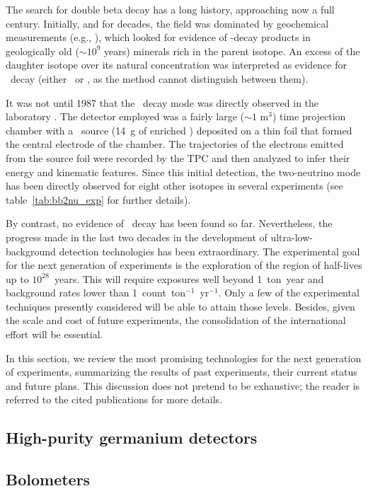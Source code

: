 The search for double beta decay has a long history, approaching now a full century. Initially, and for decades, the field was dominated by geochemical measurements (e.g., \cite{Inghram:1950qv}), which looked for evidence of \bb-decay products in geologically old ($\sim 10^9$ years) minerals rich in the parent isotope. An excess of the daughter isotope over its natural concentration was interpreted as evidence for \bb\ decay (either \bbtnu\ or \bbonu, as the method cannot distinguish between them). 

It was not until 1987 that the \bbtnu\ decay mode was directly observed in the laboratory \cite{Elliott:1987kp,Moe:2014ioa}. The detector employed was a fairly large ($\sim1$ m$^{3}$) time projection chamber with a \bb\ source (14~g of enriched ) deposited on a thin foil that formed the central electrode of the chamber. The trajectories of the electrons emitted from the source foil were recorded by the TPC and then analyzed to infer their energy and kinematic features. Since this initial detection, the two-neutrino mode has been directly observed for eight other isotopes in several experiments (see table~\ref{tab:bb2nu_exp} for further details).

By contrast, no evidence of \bbonu\ decay has been found so far. Nevertheless, the progress made in the last two decades in the development of ultra-low-background detection technologies has been extraordinary. The experimental goal for the next generation of experiments is the exploration of the region of half-lives up to $10^{28}$~years. This will require exposures well beyond 1~ton~year and background rates lower than 1~count~ton$^{-1}$~yr$^{-1}$. Only a few of the experimental techniques presently considered will be able to attain those levels. Besides, given the scale and cost of future experiments, the consolidation of the international effort will be essential.

In this section, we review the most promising technologies for the next generation of experiments, summarizing the results of past experiments, their current status and future plans. This discussion does not pretend to be exhaustive; the reader is referred to the cited publications for more details.

\subsection{High-purity germanium detectors} 
\label{subsec:hpge}


\subsection{Bolometers} \label{subsec:bolometers}



